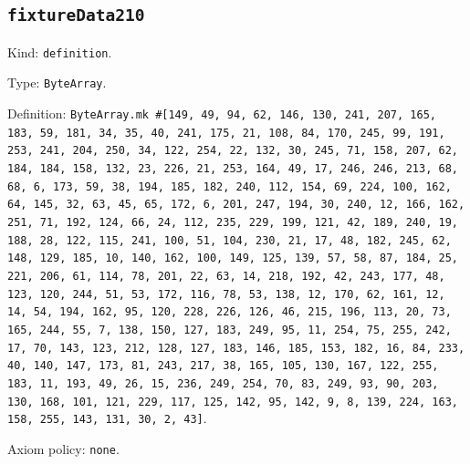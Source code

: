 \documentclass[11pt]{article}
\begin{document}
\subsection*{\texttt{fixtureData210}}
\noindent Kind: \texttt{definition}.\par
\noindent Type: \texttt{ByteArray}.\par
\noindent Definition: \texttt{ByteArray.mk \#[149, 49, 94, 62, 146, 130, 241, 207, 165, 183, 59, 181, 34, 35, 40, 241, 175, 21, 108, 84, 170, 245, 99, 191, 253, 241, 204, 250, 34, 122, 254, 22, 132, 30, 245, 71, 158, 207, 62, 184, 184, 158, 132, 23, 226, 21, 253, 164, 49, 17, 246, 246, 213, 68, 68, 6, 173, 59, 38, 194, 185, 182, 240, 112, 154, 69, 224, 100, 162, 64, 145, 32, 63, 45, 65, 172, 6, 201, 247, 194, 30, 240, 12, 166, 162, 251, 71, 192, 124, 66, 24, 112, 235, 229, 199, 121, 42, 189, 240, 19, 188, 28, 122, 115, 241, 100, 51, 104, 230, 21, 17, 48, 182, 245, 62, 148, 129, 185, 10, 140, 162, 100, 149, 125, 139, 57, 58, 87, 184, 25, 221, 206, 61, 114, 78, 201, 22, 63, 14, 218, 192, 42, 243, 177, 48, 123, 120, 244, 51, 53, 172, 116, 78, 53, 138, 12, 170, 62, 161, 12, 14, 54, 194, 162, 95, 120, 228, 226, 126, 46, 215, 196, 113, 20, 73, 165, 244, 55, 7, 138, 150, 127, 183, 249, 95, 11, 254, 75, 255, 242, 17, 70, 143, 123, 212, 128, 127, 183, 146, 185, 153, 182, 16, 84, 233, 40, 140, 147, 173, 81, 243, 217, 38, 165, 105, 130, 167, 122, 255, 183, 11, 193, 49, 26, 15, 236, 249, 254, 70, 83, 249, 93, 90, 203, 130, 168, 101, 121, 229, 117, 125, 142, 95, 142, 9, 8, 139, 224, 163, 158, 255, 143, 131, 30, 2, 43]}.\par
\noindent Axiom policy: \texttt{none}.\par
\end{document}
